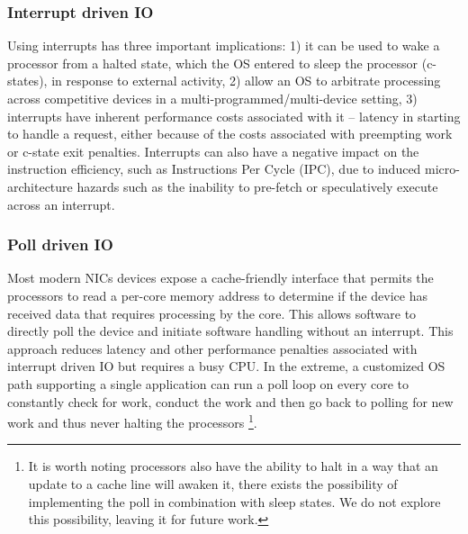 \subsubsection{Interrupt driven IO}
\label{sec:workflow:interruptio}
Using interrupts has three important implications: 1) it can be used to wake a processor from a halted state, which the OS entered to sleep the processor (c-states), in response to external activity, 2) allow an OS to arbitrate processing across competitive devices in a multi-programmed/multi-device setting, 3) interrupts have inherent performance costs associated with it --  latency in starting to handle a request, either because of the costs associated with preempting work~\cite{whenpollisbetter} or c-state exit penalties\cite{cpuidle_policy}. Interrupts can also have a negative impact on the instruction efficiency, such as Instructions Per Cycle (IPC), due to induced micro-architecture hazards such as the inability to pre-fetch or speculatively execute across an interrupt.

\subsubsection{Poll driven IO}
\label{sec:workflow:pollio}
Most modern NICs devices expose a cache-friendly interface that permits the processors to read a per-core memory address to determine if the device has received data that requires processing by the core.  This allows software to directly poll the device and initiate software handling without an interrupt.  This approach reduces latency and other performance penalties associated with interrupt driven IO but requires a busy CPU. In the extreme, a customized OS path supporting a single application can run a poll loop on every core to constantly check for work, conduct the work and then go back to polling for new work and thus never halting the processors \footnote{It is worth noting processors also have the ability to halt in a way that an update to a cache line will awaken it, there exists the possibility of implementing the poll in combination with sleep states. We do not explore this possibility, leaving it for future work.}.




